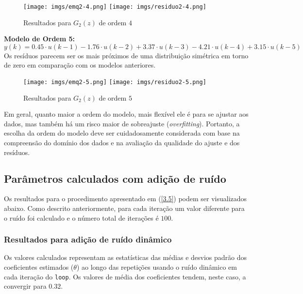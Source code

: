 \documentclass[a4paper,12pt]{article}
\begin{document}
\begin{figure}[h!]
\begin{center}
	\texttt{[image: imgs/emq2-4.png]} \quad
	\texttt{[image: imgs/residuo2-4.png]}
\caption{Resultados para $G_2(z)$ de ordem $4$} \label{fig14}
\end{center}
\end{figure}

\newpage
\noindent \textbf{Modelo de Ordem 5:}
\begin{equation*}
   y(k) = 0.45 \cdot u(k-1) - 1.76 \cdot u(k-2) + 3.37 \cdot u(k-3) - 4.21 \cdot u(k-4) + 3.15 \cdot u(k-5)\tag{4.4.2.5}
\end{equation*}
Os resíduos parecem ser os mais próximos de uma distribuição simétrica em torno de zero em comparação com os modelos anteriores.

\begin{figure}[h!]
\begin{center}
	\texttt{[image: imgs/emq2-5.png]} \quad
	\texttt{[image: imgs/residuo2-5.png]}
\caption{Resultados para $G_2(z)$ de ordem $5$} \label{fig15}
\end{center}
\end{figure}

Em geral, quanto maior a ordem do modelo, mais flexível ele é para se ajustar aos dados, mas também há um risco maior de sobreajuste (\textit{overfitting}). Portanto, a escolha da ordem do modelo deve ser cuidadosamente considerada com base na compreensão do domínio dos dados e na avaliação da qualidade do ajuste e dos resíduos.

\subsection{Parâmetros calculados com adição de ruído}

Os resultados para o procedimento apresentado em (\ref{3.5}) podem ser visualizados abaixo. Como descrito anteriormente, para cada iteração um valor diferente para o ruído foi calculado e o número total de iterações é $100$.

\subsubsection{Resultados para adição de ruído dinâmico}

Os valores calculados representam as estatísticas das médias e desvios padrão dos coeficientes estimados ($\theta$) ao longo das repetições usando o ruído dinâmico em cada iteração do \texttt{loop}. Os valores de média dos coeficientes tendem, neste caso, a convergir para $0.32$. 
\end{document}
